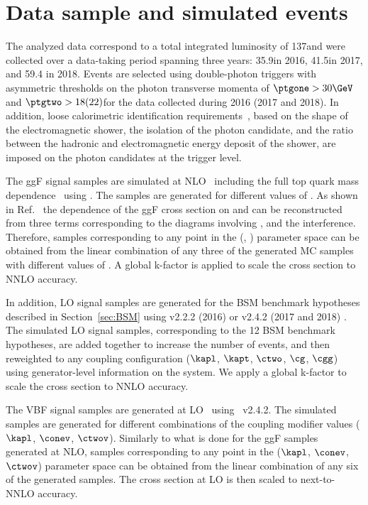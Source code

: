 \documentclass[11pt,a4paper,cmspaper,final,collab]{cms-tdr}
\begin{document}
\section{Data sample and simulated events} \label{sec:samples}
The analyzed data correspond to a total integrated luminosity of 137\fbinv and were collected over a data-taking period spanning three years: 35.9\fbinv in 2016, 41.5\fbinv in 2017, and \mbox{59.4\fbinv} in 2018.
Events are selected using double-photon triggers with asymmetric thresholds on the photon transverse momenta of $\ptgone > 30\GeV$ and $\ptgtwo > 18 (22)$\GeV for the data collected during 2016 (2017 and 2018). In addition, loose calorimetric identification requirements~\cite{Sirunyan:2018ouh}, based on the shape of the electromagnetic shower, the isolation of the photon candidate, and the ratio between the hadronic and electromagnetic energy deposit of the shower, are imposed on the photon candidates at the trigger level. 

The ggF \HH signal samples are simulated at NLO~\cite{Bagnaschi:2011tu,Heinrich:2017kxx,Heinrich:2019bkc,Jones:2017giv} including
the full top quark mass dependence~\cite{Buchalla:2018yce} using . 
The samples are generated for different values of \kapl. As shown in Ref.~\cite{Heinrich:2019bkc} the dependence of the ggF \HH cross section on \kapl and \kapt can be reconstructed from three terms corresponding to the diagrams involving \kapl, \kapt and the interference. Therefore, samples corresponding to any point in the (\kapl, \kapt) parameter space can be obtained from the linear combination of any three of the generated MC samples with different values of \kapl.
A global k-factor is applied to scale the cross section to NNLO accuracy.

In addition, LO signal samples are generated for the BSM benchmark hypotheses described in Section~\ref{sec:BSM} using \MGvATNLO v2.2.2 (2016) or v2.4.2 (2017 and 2018) \cite{Alwall:2014hca, Hespel:2014sla, Frederix:2014hta}.
The simulated LO signal samples, corresponding to the 12 BSM benchmark hypotheses, are added together to increase the number of events, and then reweighted to any coupling configuration ($\kapl$, $\kapt$, $\ctwo$, $\cg$, $\cgg$) using generator-level information on the \HH system. We apply a global k-factor to scale the cross section to NNLO accuracy.

The VBF \HH signal samples are generated at LO~\cite{Alwall:2014hca} using \MGvATNLO~v2.4.2. The simulated samples are generated for different combinations of the coupling modifier values ($\kapl$, $\conev$, $\ctwov$). Similarly to what is done for the ggF \HH samples generated at NLO, samples corresponding to any point in the ($\kapl$, $\conev$, $\ctwov$) parameter space can be obtained from the linear combination of any six of the generated samples. The cross section at LO is then scaled to next-to-NNLO accuracy.
\end{document}
